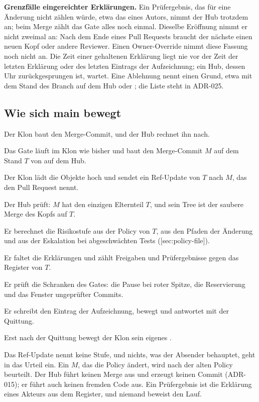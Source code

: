 \startinfobox
{\bf Grenzfälle eingereichter Erklärungen.}
Ein Prüfergebnis, das für eine Änderung nicht zählen würde, etwa das eines Autors,
nimmt der Hub trotzdem an; beim Merge zählt das Gate alles noch einmal.
Dieselbe Eröffnung nimmt er nicht zweimal an: Nach dem Ende eines Pull Requests braucht der
nächste einen neuen Kopf oder andere Reviewer.
Einen Owner-Override nimmt diese Fassung noch nicht an.
Die Zeit einer gehaltenen Erklärung liegt nie vor der Zeit der letzten Erklärung oder des
letzten Eintrags der Aufzeichnung; ein Hub, dessen Uhr zurückgesprungen ist, wartet.
Eine Ablehnung nennt einen Grund, etwa  mit dem Stand des Branch auf dem Hub oder
; die Liste steht in ADR-025.
\stopinfobox

\subsection[sec:main-moves]{Wie sich main bewegt}

Der Klon baut den Merge-Commit, und der Hub rechnet ihn nach.

\startitemize[n]
\item Das Gate läuft im Klon wie bisher und baut den Merge-Commit $M$ auf dem Stand $T$ von
 auf dem Hub.
\item Der Klon lädt die Objekte hoch und sendet ein Ref-Update von $T$ nach $M$, das den Pull
Request nennt.
\item Der Hub prüft: $M$ hat den einzigen Elternteil $T$, und sein Tree ist der saubere Merge des
Kopfs auf $T$.
\item Er berechnet die Risikostufe aus der Policy von $T$, aus den Pfaden der Änderung und aus
der Eskalation bei abgeschwächten Tests ([sec:policy-file]).
\item Er faltet die Erklärungen und zählt Freigaben und Prüfergebnisse gegen das Register von
$T$.
\item Er prüft die Schranken des Gates: die Pause bei roter Spitze, die Reservierung und das
Fenster ungeprüfter Commits.
\item Er schreibt den Eintrag der Aufzeichnung, bewegt  und antwortet mit der Quittung.
\item Erst nach der Quittung bewegt der Klon sein eigenes .
\stopitemize

Das Ref-Update nennt keine Stufe, und nichts, was der Absender behauptet, geht in das Urteil ein.
Ein $M$, das die Policy ändert, wird nach der alten Policy beurteilt.
Der Hub führt keinen Merge aus und erzeugt keinen Commit (ADR-015); er führt auch keinen fremden
Code aus.
Ein Prüfergebnis ist die Erklärung eines Akteurs aus dem Register, und niemand beweist den Lauf.

